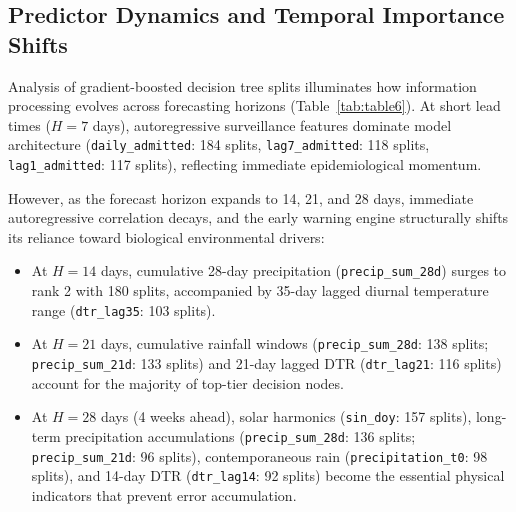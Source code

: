 \documentclass[11pt,a4paper]{article}
\begin{document}
\subsection{Predictor Dynamics and Temporal Importance Shifts}
Analysis of gradient-boosted decision tree splits illuminates how information processing evolves across forecasting horizons (Table~\ref{tab:table6}). At short lead times ($H=7$ days), autoregressive surveillance features dominate model architecture (\texttt{daily\_admitted}: 184 splits, \texttt{lag7\_admitted}: 118 splits, \texttt{lag1\_admitted}: 117 splits), reflecting immediate epidemiological momentum. 

However, as the forecast horizon expands to 14, 21, and 28 days, immediate autoregressive correlation decays, and the early warning engine structurally shifts its reliance toward biological environmental drivers:
\begin{itemize}
    \item At $H=14$ days, cumulative 28-day precipitation (\texttt{precip\_sum\_28d}) surges to rank 2 with 180 splits, accompanied by 35-day lagged diurnal temperature range (\texttt{dtr\_lag35}: 103 splits).
    \item At $H=21$ days, cumulative rainfall windows (\texttt{precip\_sum\_28d}: 138 splits; \texttt{precip\_sum\_21d}: 133 splits) and 21-day lagged DTR (\texttt{dtr\_lag21}: 116 splits) account for the majority of top-tier decision nodes.
    \item At $H=28$ days (4 weeks ahead), solar harmonics (\texttt{sin\_doy}: 157 splits), long-term precipitation accumulations (\texttt{precip\_sum\_28d}: 136 splits; \texttt{precip\_sum\_21d}: 96 splits), contemporaneous rain (\texttt{precipitation\_t0}: 98 splits), and 14-day DTR (\texttt{dtr\_lag14}: 92 splits) become the essential physical indicators that prevent error accumulation.
\end{itemize}
\end{document}
